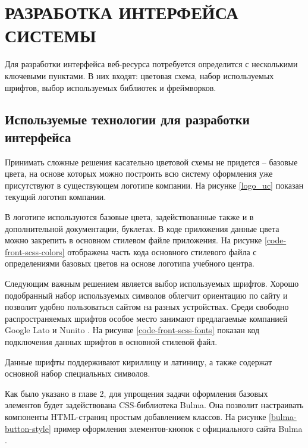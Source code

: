 \section{РАЗРАБОТКА ИНТЕРФЕЙСА СИСТЕМЫ}

Для разработки интерфейса веб-ресурса потребуется определится с несколькими ключевыми пунктами.
В них входят: цветовая схема, набор используемых шрифтов, выбор используемых библиотек и фреймворков.

\subsection{Используемые технологии для разработки интерфейса}

Принимать сложные решения касательно цветовой схемы не придется -- базовые цвета, на основе которых можно построить всю систему оформления уже присутствуют в существующем логотипе компании.
На рисунке \ref{logo_uc} показан текущий логотип компании.


В логотипе используются базовые цвета, задействованные также и в дополнительной документации, буклетах.
В коде приложения данные цвета можно закрепить в основном стилевом файле приложения.
На рисунке \ref{code-front-scss-colors} отображена часть кода основного стилевого файла с определениями базовых цветов на основе логотипа учебного центра.


Следующим важным решением является выбор используемых шрифтов.
Хорошо подобранный набор используемых символов облегчит ориентацию по сайту и позволит удобно пользоваться сайтом на разных устройствах.
Среди свободно распространяемых шрифтов особое место занимают предлагаемые компанией Google Lato \cite{google-lato} и Nunito \cite{google-nunito}.
На рисунке \ref{code-front-scss-fonts} показан код подключения данных шрифтов в основной стилевой файл.


Данные шрифты поддерживают кириллицу и латиницу, а также содержат основной набор специальных символов.

Как было указано в главе 2, для упрощения задачи оформления базовых элементов будет задействована CSS-библиотека Bulma.
Она позволит настраивать компоненты HTML-страниц простым добавлением классов.
На рисунке \ref{bulma-button-style} пример оформления элементов-кнопок с официального сайта Bulma \cite{bulma}.


